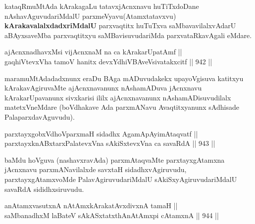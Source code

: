 \begin{artha}
kataqRmuMtAda kArakagaLu tatavxjAcnxnavu huTiTxdoDane nAshavAguvudariMdalU parxmeVyavu(Atamxtatavxvu) \textbf{kArakavalalxdadxriMdalU} parxvaqtitx huTuTxva saMbavavilalxvAdarU aBAyxsaveMba parxvaqtitxyu saMBavisuvudariMda parxvataRkavAgali eMdare.
\end{artha}

\begin{shl}
ajAcnxnadhavxMsi vijAcnxnaM na ca kArakarUpatAmf || \\
gaqhiVtevxVha tamoV hanitx devxYdhiVBAveV\s sivatakxcitf \hfill || 942 ||  
\end{shl}

\begin{artha}
maramuMtAdadadxnunx eraDu BAga mADuvudakekx upayoVgisuva katitxyu kArakavAgiruvaMte ajAcnxnavanunx nAshamADuva jAcnxnavu kArakarUpavanunx sivxkarisi ililx ajAcnxnavanunx nAshamADisuvudilalx matetxVneMdare (boVdhakave Ada parxmANavu Avaqtitxyanunx sAdhisade PalaparxdavAguvudu).
\end{artha}

\begin{shl}
\footnotemark[1]parxtayxgobxVdhoV\s parxmaH sidadhx AgamApAyimAtaqvatf || \\
parxtayxknABxtarxPalatevxVna sAkiSxtevxVna ca savaRdA \hfill || 943 ||  
\end{shl}

\begin{artha}
baMdu hoVguva (nashavxravAda) parxmAtaqvaMte parxtayxgAtamxna jAcnxnavu parxmANavilalxde savxtaH sidadhxvAgiruvudu, parxtayxgAtamxvoMde PalavAgiruvudariMdalU sAkiSxyAgiruvudariMdalU savaRdA sididhxsiruvudu.
\end{artha}


\begin{shl}
anAtamxvasutxnA nA\s \s tAmx\s kArakatAvxdivxnA tamaH || \\
saMbanadhxM laBateV sAkASxtatxthA\s nAtAmx\s pi cA\s \s tamxnA \hfill || 944 ||  
\end{shl}

